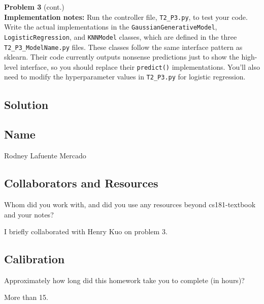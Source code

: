 \documentclass[submit]{harvardml}
\begin{document}
\newpage

\begin{framed}
\noindent\textbf{Problem 3} (cont.)\\


\textbf{Implementation notes:} Run the controller file, \texttt{T2\_P3.py},
to test your code. Write the actual implementations in the \texttt{GaussianGenerativeModel},
\texttt{LogisticRegression}, and \texttt{KNNModel} classes, which are defined in the three
\texttt{T2\_P3\_ModelName.py} files. These classes follow the same interface pattern
as sklearn. Their code
currently outputs nonsense predictions just to show the
high-level interface, so you should replace their \texttt{predict()} implementations.
You'll also need to modify the hyperparameter
values in \texttt{T2\_P3.py} for logistic regression.
\end{framed}


\subsection*{Solution}

\newpage
\subsection*{Name}
Rodney Lafuente Mercado

\subsection*{Collaborators and Resources}
Whom did you work with, and did you use any resources beyond cs181-textbook and your notes?

I briefly collaborated with Henry Kuo on problem 3. 
\subsection*{Calibration}
Approximately how long did this homework take you to complete (in hours)?

More than 15.
\end{document}

